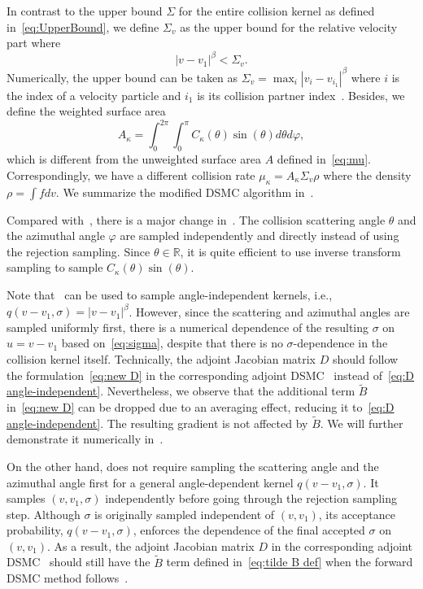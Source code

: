 \documentclass[12pt,nopreprintline]{elsarticle}
\begin{document}
In contrast to the upper bound $\Sigma$ for the entire collision kernel as defined in~\eqref{eq:UpperBound}, we define $\Sigma_v$ as the upper bound for the relative velocity part where
\begin{equation}\label{eq:UpperBound_V}
    |v-v_1|^\beta < \Sigma_v.
\end{equation}
Numerically, the upper bound can be taken as $\Sigma_v = \max_i |v_i - v_{i_1}|^\beta$ where $i$ is the index of a velocity particle and $i_1$ is its collision partner index~\cite{pareschi2001introduction}. Besides, we define the weighted surface area
\begin{equation}\label{eq:beta Sphere area}
    A_\kappa = \int_{0}^{2 \pi} \int_{0}^{\pi} C_\kappa(\theta) \sin (\theta) d\theta d\varphi,
\end{equation}
which is different from the unweighted surface area $A$ defined in~\eqref{eq:mu}. Correspondingly, we have a different collision rate $\mu_\kappa = A_\kappa \Sigma_v \rho$ where the density $\rho = \int f dv$. We summarize the modified DSMC algorithm in~.



Compared with~, there is a major change in~. The collision scattering angle $\theta$ and the azimuthal angle $\varphi$ are sampled independently and directly instead of using the rejection sampling. Since $\theta \in \mathbb R$, it is quite efficient to use inverse transform sampling to sample $C_\kappa(\theta)  \sin (\theta)$. 


Note that~ can be used to sample angle-independent kernels, i.e., $q(v-v_1,\sigma) = |v-v_1|^\beta$. However, since the scattering and azimuthal angles are sampled uniformly first, there is a numerical dependence of the resulting $\sigma$ on $u = v-v_1$ based on~\cref{eq:sigma}, despite that there is no $\sigma$-dependence in the collision kernel itself. Technically, the adjoint Jacobian matrix $D$ should follow the formulation~\eqref{eq:new D} in the corresponding adjoint DSMC~ instead of~\eqref{eq:D angle-independent}. Nevertheless, we observe that the additional term $\widetilde B$ in~\eqref{eq:new D} can be dropped due to an averaging effect, reducing it to~\eqref{eq:D angle-independent}. The resulting gradient is not affected by $\widetilde B$. We will further demonstrate it numerically in~.



On the other hand,  does not require sampling the scattering angle and the azimuthal angle first for a general angle-dependent kernel $q(v-v_1,\sigma)$. It samples $(v,v_1,\sigma)$ independently  before going through the rejection sampling step. Although $\sigma$ is originally sampled independent of $(v,v_1)$, its acceptance probability, $q(v-v_1,\sigma)$, enforces the dependence of the final accepted $\sigma$ on $(v,v_1)$. As a result, the adjoint Jacobian matrix $D$ in the corresponding adjoint DSMC~ should still have the $\widetilde B$ term defined in~\eqref{eq:tilde B def} when the forward DSMC method follows~.
\end{document}
